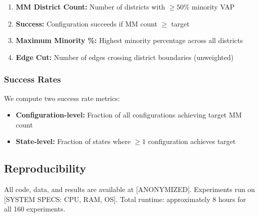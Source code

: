 \begin{enumerate}
    \item \textbf{MM District Count:} Number of districts with $\geq50\%$ minority VAP
    \item \textbf{Success:} Configuration succeeds if MM count $\geq$ target
    \item \textbf{Maximum Minority \%:} Highest minority percentage across all districts
    \item \textbf{Edge Cut:} Number of edges crossing district boundaries (unweighted)
\end{enumerate}

\subsubsection{Success Rates}

We compute two success rate metrics:
\begin{itemize}
    \item \textbf{Configuration-level:} Fraction of all configurations achieving target MM count
    \item \textbf{State-level:} Fraction of states where $\geq1$ configuration achieves target
\end{itemize}

\subsection{Reproducibility}

All code, data, and results are available at [ANONYMIZED]. Experiments run on [SYSTEM SPECS: CPU, RAM, OS]. Total runtime: approximately 8 hours for all 160 experiments.
